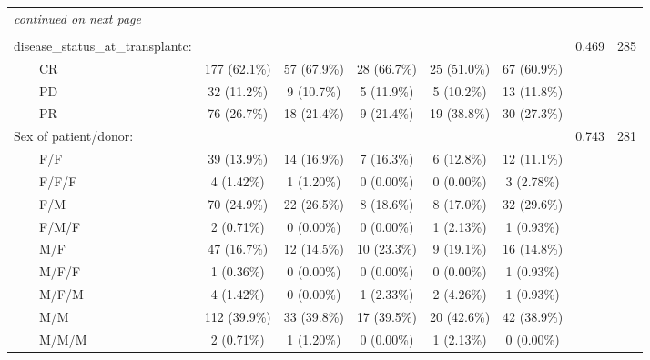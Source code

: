 \documentclass{article}
\begin{document}
\begin{Schunk}
\begin{small}
\begin{longtable}{lccccccc}
    \hline
    \hline  
    \endhead   
    \hline
    \multicolumn{8}{l}{\textit{continued on next page}} \\ 
    \endfoot   
    \multicolumn{8}{l}{}  \\ 
    \endlastfoot 
    disease\_status\_at\_transplantc: &             &            &            &            &            &   0.469   & 285\\ 
$\qquad$CR & 177 (62.1\%) & 57 (67.9\%) & 28 (66.7\%) & 25 (51.0\%) & 67 (60.9\%) &           &    \\ 
$\qquad$PD & 32 (11.2\%)  & 9 (10.7\%)  & 5 (11.9\%)  & 5 (10.2\%)  & 13 (11.8\%) &           &    \\ 
$\qquad$PR & 76 (26.7\%)  & 18 (21.4\%) & 9 (21.4\%)  & 19 (38.8\%) & 30 (27.3\%) &           &    \\ 
Sex of patient/donor: &             &            &            &            &            &   0.743   & 281\\ 
$\qquad$F/F & 39 (13.9\%)  & 14 (16.9\%) & 7 (16.3\%)  & 6 (12.8\%)  & 12 (11.1\%) &           &    \\ 
$\qquad$F/F/F &  4 (1.42\%)  & 1 (1.20\%)  & 0 (0.00\%)  & 0 (0.00\%)  & 3 (2.78\%)  &           &    \\ 
$\qquad$F/M & 70 (24.9\%)  & 22 (26.5\%) & 8 (18.6\%)  & 8 (17.0\%)  & 32 (29.6\%) &           &    \\ 
$\qquad$F/M/F &  2 (0.71\%)  & 0 (0.00\%)  & 0 (0.00\%)  & 1 (2.13\%)  & 1 (0.93\%)  &           &    \\ 
$\qquad$M/F & 47 (16.7\%)  & 12 (14.5\%) & 10 (23.3\%) & 9 (19.1\%)  & 16 (14.8\%) &           &    \\ 
$\qquad$M/F/F &  1 (0.36\%)  & 0 (0.00\%)  & 0 (0.00\%)  & 0 (0.00\%)  & 1 (0.93\%)  &           &    \\ 
$\qquad$M/F/M &  4 (1.42\%)  & 0 (0.00\%)  & 1 (2.33\%)  & 2 (4.26\%)  & 1 (0.93\%)  &           &    \\ 
$\qquad$M/M & 112 (39.9\%) & 33 (39.8\%) & 17 (39.5\%) & 20 (42.6\%) & 42 (38.9\%) &           &    \\ 
$\qquad$M/M/M &  2 (0.71\%)  & 1 (1.20\%)  & 0 (0.00\%)  & 1 (2.13\%)  & 0 (0.00\%)  &           &     \\ 
 

\end{longtable}
\end{small}
\end{Schunk}
\end{document}
